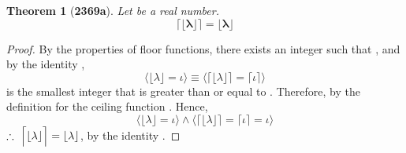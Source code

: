 \documentclass[preview]{standalone}
\newtheorem{theorem}{Theorem}
\begin{document}
\begin{theorem}[\textbf{2369a}]
    Let \bm{$\lambda$} be a real number. 
    \begin{equation*}
        \bm{
            \Big \lceil \lfloor \lambda \rfloor \Big \rceil 
                = 
            \lfloor \lambda \rfloor
        }
    \end{equation*}
\end{theorem}

\begin{proof}
    By the properties of floor functions, 
    there exists an integer \bm{$\iota$} such that
    \bm{$\lfloor \lambda \rfloor = \iota$}, 
    and by the identity \bm{$\iota$},
    \begin{equation*}
        \bigg \langle \lfloor \lambda \rfloor = \iota \bigg \rangle
            \equiv
        \bigg \langle 
            \Big \lceil \lfloor \lambda \rfloor \Big \rceil
                =
            \big \lceil \iota \big \rceil
        \bigg \rangle
    \end{equation*}
    \bm{$\iota$} is the smallest integer that is greater than or equal to \bm{$\iota$}.
    Therefore, by the definition for the ceiling function 
    \bm{$\lceil \iota \rceil = \iota$}.
    Hence,
    \begin{equation*}
        \bigg \langle \lfloor \lambda \rfloor = \iota \bigg \rangle
            \land
        \bigg \langle 
            \Big \lceil \lfloor \lambda \rfloor \Big \rceil
                =
            \lceil \iota \rceil
                =
            \iota
        \bigg \rangle
    \end{equation*}
    $\therefore \text{\space} \relax{
        \Big \lceil \lfloor \lambda \rfloor \Big \rceil 
            = 
        \lfloor \lambda \rfloor
    }$, by the identity \bm{$\iota$}.
\end{proof}
\end{document}
